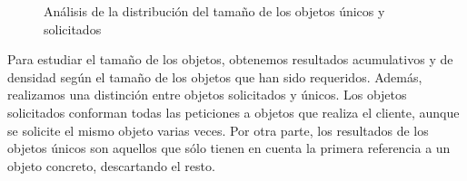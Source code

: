 \documentclass[twocolumn]{Jornadas}
\begin{document}
\begin{figure}[ht!]
\centering
{}
\caption{Análisis de la distribución del tamaño de los objetos únicos y solicitados}
\label{fig:tamObjetos}
\end{figure}

Para estudiar el tamaño de los objetos, obtenemos resultados acumulativos y de densidad según el tamaño de los objetos que han sido requeridos.
Además, realizamos una distinción entre objetos solicitados y únicos.
Los objetos solicitados conforman todas las peticiones a objetos que realiza el cliente, aunque se solicite el mismo objeto varias veces. Por otra parte, los resultados de los objetos únicos son aquellos que sólo tienen en cuenta la primera referencia a un objeto concreto, descartando el resto.
\end{document}
